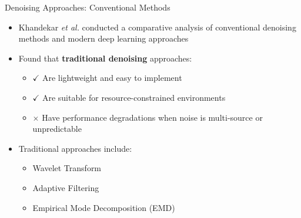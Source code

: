 \documentclass{beamer}
\begin{document}
\begin{frame}{Denoising Approaches: Conventional Methods}
    \begin{itemize}
        \item Khandekar \textit{et al.} conducted a comparative analysis of conventional denoising methods and modern deep learning approaches~\cite{Khandekar2025ECGDF}
        \item Found that \textbf{traditional denoising} approaches:
        \begin{itemize}
            \item $\checkmark$ Are lightweight and easy to implement
            \item $\checkmark$ Are suitable for resource-constrained environments
            \item $\times$ Have performance degradations when noise is multi-source or unpredictable
        \end{itemize}
        \item Traditional approaches include:
        \begin{itemize}
            \item Wavelet Transform 
            \item Adaptive Filtering
            \item Empirical Mode Decomposition (EMD) 
        \end{itemize}
    \end{itemize}
\end{frame}
\end{document}
